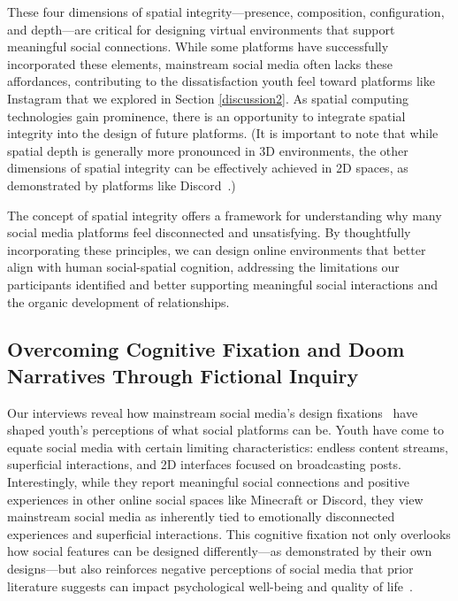 These four dimensions of spatial integrity---presence, composition, configuration, and depth---are critical for designing virtual environments that support meaningful social connections. While some platforms have successfully incorporated these elements, mainstream social media often lacks these affordances, contributing to the dissatisfaction youth feel toward platforms like Instagram that we explored in Section \ref{discussion2}. As spatial computing technologies gain prominence, there is an opportunity to integrate spatial integrity into the design of future platforms. (It is important to note that while spatial depth is generally more pronounced in 3D environments, the other dimensions of spatial integrity can be effectively achieved in 2D spaces, as demonstrated by platforms like Discord~\cite{Kim-2025-Discord-third-place}.)

The concept of spatial integrity offers a framework for understanding why many social media platforms feel disconnected and unsatisfying. By thoughtfully incorporating these principles, we can design online environments that better align with human social-spatial cognition, addressing the limitations our participants identified and better supporting meaningful social interactions and the organic development of relationships.

\subsection{Overcoming Cognitive Fixation and Doom Narratives Through Fictional Inquiry}
Our interviews reveal how mainstream social media's design fixations~\cite{jansson1991design} have shaped youth's perceptions of what social platforms can be. Youth have come to equate social media with certain limiting characteristics: endless content streams, superficial interactions, and 2D interfaces focused on broadcasting posts. Interestingly, while they report meaningful social connections and positive experiences in other online social spaces like Minecraft or Discord, they view mainstream social media as inherently tied to emotionally disconnected experiences and superficial interactions. This cognitive fixation not only overlooks how social features can be designed differently---as demonstrated by their own designs---but also reinforces negative perceptions of social media that prior literature suggests can impact psychological well-being and quality of life~\cite{lee2024social, kim2024privacysocialnormsystematically}.

